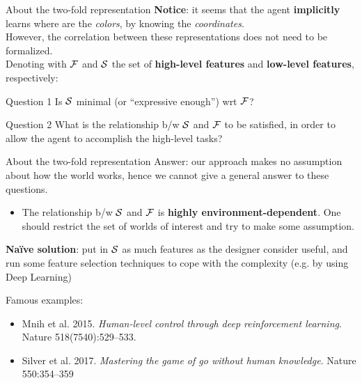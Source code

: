 \documentclass{beamer}
\begin{document}
\begin{frame}{About the two-fold representation}
	\textbf{Notice}: it seems that the agent \textbf{implicitly} learns where are the \emph{colors}, by knowing the \emph{coordinates}.\\
	
	However, the correlation between these representations does not need to be formalized.\\
	
	\vspace{0.3cm}
	Denoting with $\F$ and $\S$ the set of \textbf{high-level features} and \textbf{low-level features}, respectively:
	
	\begin{block}{Question 1}
		Is $\S$ minimal (or ``expressive enough'') wrt $\F$?
	\end{block}
	
	\begin{block}{Question 2}
		What is the relationship b/w $\S$ and $\F$ to be satisfied, in order to allow the agent to accomplish the high-level tasks?
	\end{block}

\end{frame}
\begin{frame}{About the two-fold representation}
	Answer: our approach makes no assumption about how the world works, hence we cannot give a general answer to these questions.\\
	
	\begin{itemize}
		\item The relationship b/w $\S$ and $\F$ is \textbf{highly environment-dependent}. One should restrict the set of worlds of interest and try to make some assumption.
		
	\end{itemize}
	
	\textbf{Na\"ive solution}: put in $\S$ as much features as the designer consider useful, and run some feature selection techniques to cope with the complexity (e.g. by using Deep Learning)
	
	Famous examples:
	\begin{itemize}
		\item Mnih et al. 2015. \emph{Human-level control through deep reinforcement learning}. Nature 518(7540):529–533.
		\item Silver et al. 2017. \emph{Mastering the game of go without human knowledge}. Nature 550:354–359
	\end{itemize}
\end{frame}
\end{document}
